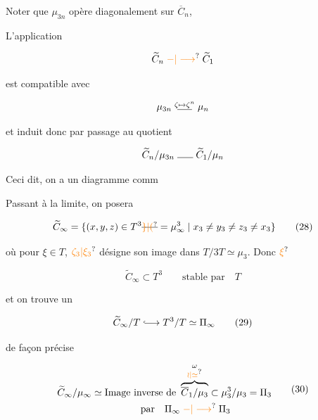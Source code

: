 Noter que $\mu_{3n}$ opère diagonalement sur $\overline C_n$,


L'application

\[
\widetilde C_n\mathrel{\unsure{-|\longrightarrow}}\widetilde C_1
\]

est compatible avec

\[
\mu_{3n}\mathrel{\overset{\zeta\mapsto\zeta^n}{\rule{1.5em}{0.4pt}}}\mu_{n}
\]

et induit donc par passage au quotient

\[
\widetilde C_n/\mu_{3n}\mathrel{\rule{1.6em}{0.4pt}}\widetilde C_1/\mu_n
\]

Ceci dit, on a un diagramme comm


Passant à la limite, on posera

\[
\widetilde C_\infty=\{(x,y,z)\in T^3\deleted{\unsure{\}|(}}= \mu_\infty^3\mid x_3\ne y_3\ne z_3\ne x_3\}
\tag*{(28)}
\]

où pour $\xi\in T$, $\unsure{\zeta_3|\xi_3}$ désigne son image dans $T/3T\simeq\mu_3$. Donc $\unsure{\xi}$

\[
\widetilde C_\infty\subset T^3\qquad\text{stable par}\quad T
\]

et on trouve un

\[
\widetilde C_\infty/T\lhook\joinrel\longrightarrow T^3/T\simeq\Pi_\infty
\tag*{(29)}
\]



de façon précise

\[
\begin{aligned}
\widetilde C_\infty/\mu_\infty&\simeq\text{Image inverse de }\overbrace{\overline C_1/\mu_3}^{\substack{\omega\\\unsure{\wr|\simeq}}}\subset\mu_3^3/\mu_3=\Pi_3\\
&\hspace{5em}\text{par}\quad\Pi_\infty\mathrel{\unsure{-|\longrightarrow}}\Pi_3
\end{aligned}\tag*{(30)}
\]

